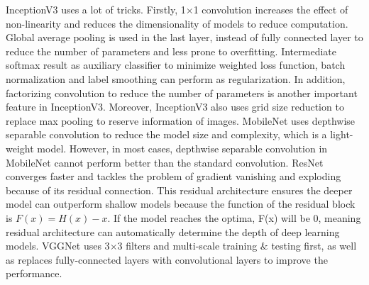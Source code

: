 \documentclass{article}
\begin{document}
\begin{table}[htbp]
\centering
\caption{The Summary of All Models}\label{tab1}
\end{table}

InceptionV3\cite{szegedy2016rethinking} uses a lot of tricks. Firstly, 1$\times$1 convolution increases the effect of non-linearity and reduces the dimensionality of models to reduce computation. Global average pooling is used in the last layer, instead of fully connected layer to reduce the number of parameters and less prone to overfitting. Intermediate softmax result as auxiliary classifier to minimize weighted loss function, batch normalization and label smoothing can perform as regularization. In addition, factorizing convolution to reduce the number of parameters is another important feature in InceptionV3. Moreover, InceptionV3 also uses grid size reduction to replace max pooling to reserve information of images. MobileNet\cite{howard2017mobilenets} uses depthwise separable convolution to reduce the model size and complexity, which is a light-weight model. However, in most cases, depthwise separable convolution in MobileNet cannot perform better than the standard convolution. ResNet\cite{he2016deep} converges faster and tackles the problem of gradient vanishing and exploding because of its residual connection. This residual architecture ensures the deeper model can outperform shallow models because the function of the residual block is $F(x)=H(x)-x$. If the model reaches the optima, F(x) will be 0, meaning residual architecture can automatically determine the depth of deep learning models. VGGNet\cite{simonyan2014very} uses 3$\times$3 filters and multi-scale training $\&$ testing first, as well as replaces fully-connected layers with convolutional layers to improve the performance.
\end{document}
